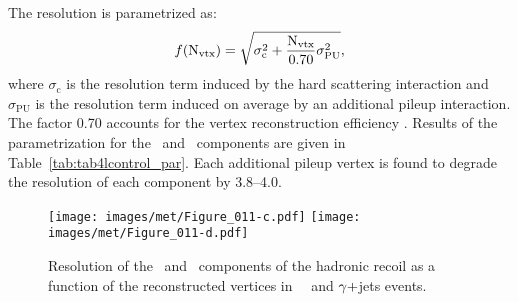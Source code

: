 The resolution is parametrized as:
\begin{equation} \label{eq:npv}
f(\mathrm{N}_{\mathrm{vtx}}) = \sqrt{\sigma_{\mathrm{c}}^2 + \frac{\mathrm{N}_{\mathrm{vtx}}}{0.70}\sigma_{\mathrm{\mathrm{PU}}}^2},
\end{equation}
where $\sigma_{\mathrm{c}}$ is the resolution term induced by the hard scattering interaction and $\sigma_{\mathrm{\mathrm{PU}}}$ is the resolution term induced on average by an additional pileup interaction. 
The factor 0.70 accounts for the vertex reconstruction efficiency \cite{CMS-DP-2017-015}. 
Results of the parametrization for the \upar\ and \uperp\ components are given in Table~\ref{tab:tab4lcontrol_par}. 
Each additional pileup vertex is found to degrade the resolution of each component by 3.8--4.0\GeV.
\begin{figure}[htbp!]
  \centering
   \texttt{[image: images/met/Figure\_011-c.pdf]}
   \texttt{[image: images/met/Figure\_011-d.pdf]}
  \caption{Resolution of the \upar\ and \uperp\ components of the hadronic recoil as a function of the reconstructed vertices in \Zmm\, \Zee\, and $\gamma+$jets events.} 
  \label{fig:resolution_vert}
\end{figure}                
